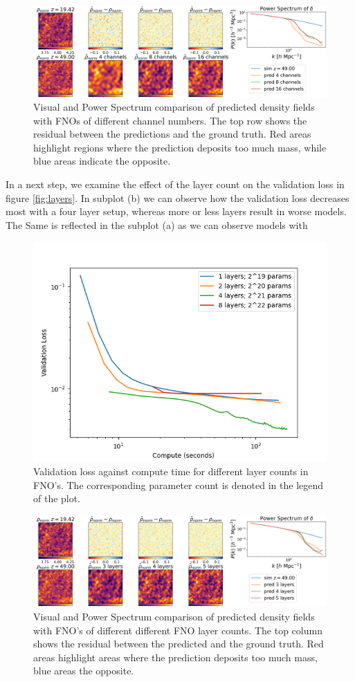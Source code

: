 \documentclass{article}
\begin{document}
\begin{figure}[t]
    \centering
    \includegraphics[width=0.95\linewidth]{img/compare_channels.png}
    \caption{Visual and Power Spectrum comparison of predicted density fields with FNOs of different channel numbers. The top row shows the residual between the predictions and the ground truth. Red areas highlight regions where the prediction deposits too much mass, while blue areas indicate the opposite.}
    \label{fig:channels-A}
\end{figure}


In a next step, we examine the effect of the layer count on the validation loss in figure \ref{fig:layers}. In subplot (b) we can observe how the validation loss decreases most with a four layer setup, whereas more or less layers result in worse models. The Same is reflected in the subplot (a) as we can observe models with 


\begin{figure}[h]
    \centering
    \includegraphics[width=0.4\linewidth]{img/layer_compute.png}
    \caption{Validation loss against compute time for different layer counts in FNO's. The corresponding parameter count is denoted in the legend of the plot.}
    \label{fig:layer-B}
\end{figure}

\begin{figure}[h]
    \centering
    \includegraphics[width=0.95\linewidth]{img/compare_layers_2.png}
    \caption{Visual and Power Spectrum comparison of predicted density fields with FNO's of different different FNO layer counts. The top column shows the residual between the predicted and the ground truth. Red areas highlight areas where the prediction deposits too much mass, blue areas the opposite. }
    \label{fig:layer-A}
\end{figure}
\end{document}
